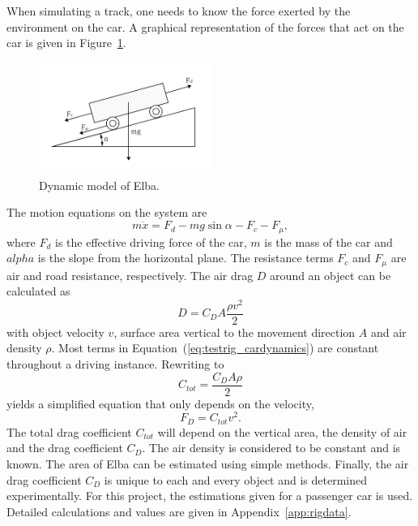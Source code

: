 When simulating a track, one needs to know the force exerted by the environment
on the car. A graphical representation of the forces that act on the car is
given in Figure~\ref{fig:testrig_elbadynamics}.
\begin{figure}[H]
    \centering
    \includegraphics[width=0.5\textwidth]{./img/testrig_elbaforces.png}
    \caption{Dynamic model of Elba.}\label{fig:testrig_elbadynamics}
\end{figure}
The motion equations on the system are 
\begin{equation} \label{eq:testrig_cardynamics}
    m\ddot{x} = F_d - mg\sin{\alpha} - F_c - F_{\mu},
\end{equation}
where $F_d$ is the effective driving force of the car, $m$ is the mass of the
car and $alpha$ is the slope from the horizontal plane. The resistance terms
$F_c$ and $F_{\mu}$ are air and road resistance, respectively. The air drag $D$
around an object can be calculated as~\cite{nakayama2002}
\begin{equation} \label{eq:testrig_airdrag}
    D = C_D A \frac{\rho v^2} {2}
\end{equation}
with object velocity $v$, surface area vertical to the movement direction $A$
and air density $\rho$. Most terms in Equation~(\ref{eq:testrig_cardynamics})
are constant throughout a driving instance. Rewriting to
\begin{equation} \label{eq:testrig_csimple}
    C_{tot} = \frac{C_D A \rho} {2}
\end{equation}
yields a simplified equation that only depends on the velocity,
\begin{equation} \label{eq:drag}
    F_D = C_{tot}v^2.
\end{equation}
The total drag coefficient $C_{tot}$ will depend on the vertical area, the density of
air and the drag coefficient $C_D$. The air density is considered to be constant
and is known. The area of Elba can be estimated using simple methods. Finally,
the air drag coefficient $C_D$ is unique to each and every object and is
determined experimentally. For this project, the estimations given for a
passenger car is used. Detailed calculations and values are given in
Appendix~\ref{app:rigdata}. 

